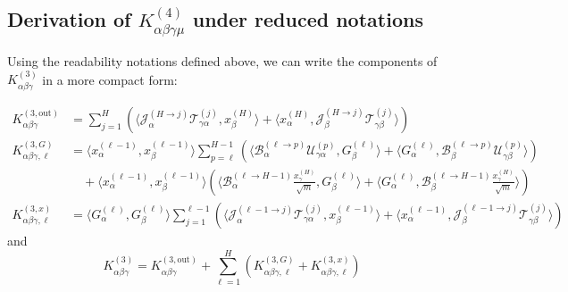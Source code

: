 \documentclass[11pt,a4paper]{article}
\theoremstyle{definition}
\begin{document}
\subsection{Derivation of $K^{(4)}_{\alpha\beta\gamma\mu}$ under reduced notations}



Using the readability notations defined above, we can write the components of $K^{(3)}_{\alpha\beta\gamma}$ in a more compact form:

\begin{align}
K^{(3, \text{out})}_{\alpha\beta\gamma} &= \sum_{j=1}^{H} \left( \langle \mathcal{J}^{(H \to j)}_{\alpha} \mathcal{T}^{(j)}_{\gamma\alpha}, x^{(H)}_\beta \rangle + \langle x^{(H)}_\alpha, \mathcal{J}^{(H \to j)}_{\beta} \mathcal{T}^{(j)}_{\gamma\beta} \rangle \right) \\
K^{(3, G)}_{\alpha\beta\gamma, \ell} &= \langle x^{(\ell-1)}_\alpha, x^{(\ell-1)}_\beta \rangle \sum_{p=\ell}^{H-1} \left( \langle \mathcal{B}^{(\ell \to p)}_{\alpha} \mathcal{U}^{(p)}_{\gamma\alpha}, G^{(\ell)}_\beta \rangle + \langle G^{(\ell)}_\alpha, \mathcal{B}^{(\ell \to p)}_{\beta} \mathcal{U}^{(p)}_{\gamma\beta} \rangle \right) \nonumber \\
&\quad + \langle x^{(\ell-1)}_\alpha, x^{(\ell-1)}_\beta \rangle \left( \langle \mathcal{B}^{(\ell \to H-1)}_{\alpha} \frac{x^{(H)}_\gamma}{\sqrt{m}}, G^{(\ell)}_\beta \rangle + \langle G^{(\ell)}_\alpha, \mathcal{B}^{(\ell \to H-1)}_{\beta} \frac{x^{(H)}_\gamma}{\sqrt{m}} \rangle \right) \\
K^{(3, x)}_{\alpha\beta\gamma, \ell} &= \langle G^{(\ell)}_\alpha, G^{(\ell)}_\beta \rangle \sum_{j=1}^{\ell-1} \left( \langle \mathcal{J}^{(\ell-1 \to j)}_{\alpha} \mathcal{T}^{(j)}_{\gamma\alpha}, x^{(\ell-1)}_\beta \rangle + \langle x^{(\ell-1)}_\alpha, \mathcal{J}^{(\ell-1 \to j)}_{\beta} \mathcal{T}^{(j)}_{\gamma\beta} \rangle \right)
\end{align}
and 
\begin{equation}
    K^{(3)}_{\alpha\beta\gamma} = K^{(3, \text{out})}_{\alpha\beta\gamma} + \sum_{\ell=1}^H \left( K^{(3, G)}_{\alpha\beta\gamma, \ell} + K^{(3, x)}_{\alpha\beta\gamma, \ell} \right)
\end{equation}
\end{document}
